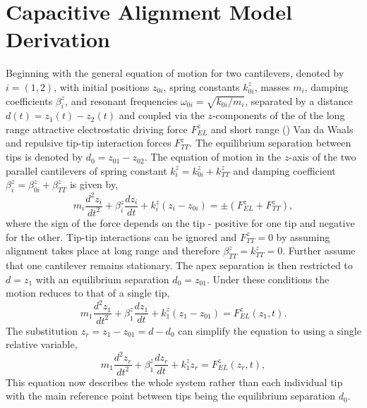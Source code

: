 \documentclass{article}
\begin{document}
\section{Capacitive Alignment Model Derivation}

Beginning with the general equation of motion for two cantilevers, denoted by $i=(1,2)$, with initial positions $z_{0i}$, spring constants $k_{0i}^z$, masses $m_i$, damping coefficients $\beta_i^z$, and resonant frequencies $\omega_{0i} = \sqrt{k_{0i}/m_i}$, separated by a distance $d(t) = z_1(t) - z_2(t)$ and coupled via the $z$-components of the of the long range attractive electrostatic driving force $F_{EL}^z$ and short range () Van da Waals and repulsive tip-tip interaction forces $F_{TT}^z$. The equilibrium separation between tips is denoted by $d_0 = z_{01} - z_{02}$. The equation of motion in the $z$-axis of the two parallel cantilevers of spring constant $k_i^z=k_{0i}^z+k_{TT}^z$ and damping coefficient $\beta_i^z=\beta_{0i}^z+\beta_{TT}^z$ is given by,
\begin{equation}
m_i\frac{d^2z_i}{dt^2}+\beta_i^z\frac{dz_i}{dt}+k_i^z\left(z_i-z_{0i}\right)=\pm\left(F_{EL}^z+F_{TT}^z\right),
\end{equation}
where the sign of the force depends on the tip - positive for one tip and negative for the other.
Tip-tip interactions can be ignored and $F_{TT}^z = 0$ by assuming alignment takes place at long range and therefore $\beta_{TT}^{z} = k_{TT}^{z} = 0$. Further assume that one cantilever remains stationary. The apex separation is then restricted to $d=z_1$ with an equilibrium separation $d_0 = z_{01}$. Under these conditions the motion reduces to that of a single tip,
\begin{equation}
m_1\frac{d^2z_1}{dt^2}+\beta_1^z\frac{dz_1}{dt}+k_1^z\left(z_1-z_{01}\right) = F_{EL}^z(z_1, t).
\label{eq:simple_eom_app}
\end{equation}
The substitution $z_r = z_1-z_{01} = d-d_{0}$ can simplify the equation to using a single relative variable,
\begin{equation}
m_1 \frac{d^2z_r}{dt^2} + \beta_1^z \frac{dz_r}{dt} + k_1^zz_r = F_{EL}^z(z_r, t),
\end{equation}
This equation now describes the whole system rather than each individual tip with the main reference point between tips being the equilibrium separation $d_0$.
\end{document}
